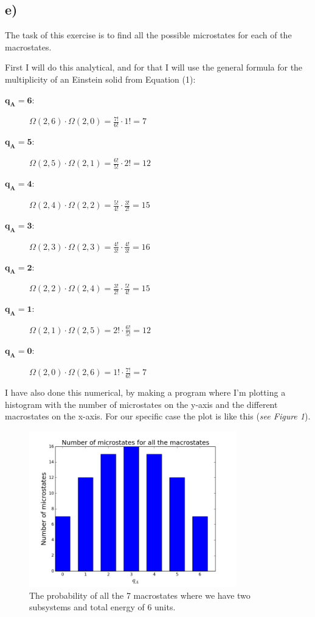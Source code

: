 \documentclass{scrartcl}
\begin{document}
\subsection*{e)}
The task of this exercise is to find all the possible microstates for each of the macrostates.\par\vspace{3mm}
First I will do this analytical, and for that I will use the general formula for the multiplicity of an Einstein solid from Equation (1):
\begin{description}
\item [$\boldsymbol{q_A=6:}$] $\Omega(2,6)\cdot\Omega(2,0)=\frac{7!}{6!}\cdot1!=7$
\item [$\boldsymbol{q_A=5:}$] $\Omega(2,5)\cdot\Omega(2,1)=\frac{6!}{5!}\cdot2!=12$
\item [$\boldsymbol{q_A=4:}$] $\Omega(2,4)\cdot\Omega(2,2)=\frac{5!}{4!}\cdot\frac{3!}{2!}=15$
\item [$\boldsymbol{q_A=3:}$] $\Omega(2,3)\cdot\Omega(2,3)=\frac{4!}{3!}\cdot\frac{4!}{3!}=16$
\item [$\boldsymbol{q_A=2:}$] $\Omega(2,2)\cdot\Omega(2,4)=\frac{3!}{2!}\cdot\frac{5!}{4!}=15$
\item [$\boldsymbol{q_A=1:}$] $\Omega(2,1)\cdot\Omega(2,5)=2!\cdot\frac{6!}{5!}=12$
\item [$\boldsymbol{q_A=0:}$] $\Omega(2,0)\cdot\Omega(2,6)=1!\cdot\frac{7!}{6!}=7$
\end{description}
\par\vspace{3mm}I have also done this numerical, by making a program where I'm plotting a histogram with the number of microstates on the y-axis and the different macrostates on the x-axis. For our specific case the plot is like this (\textit{see Figure 1}). 
\begin{figure}[!htbp]
\centering
\includegraphics[width=90mm]{oblig1e1.jpg}
\caption{The probability of all the 7 macrostates where we have two subsystems and total energy of 6 units. \label{overflow}}
\end{figure}
\end{document}
